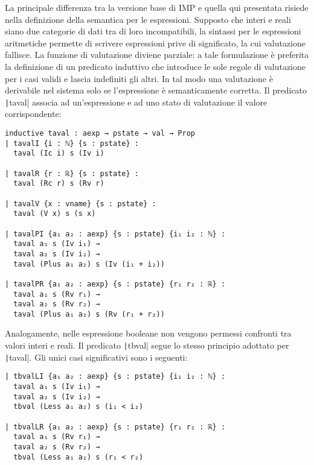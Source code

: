 La principale differenza tra la versione base di IMP e quella qui presentata risiede nella definizione della semantica per le espressioni.
Supposto che interi e reali siano due categorie di dati tra di loro incompatibili, la sintassi per le espressioni aritmetiche permette di scrivere espressioni prive di significato, la cui valutazione fallisce. La funzione di valutazione diviene parziale: a tale formulazione è preferita la definizione di un predicato induttivo che introduce le sole regole di valutazione per i casi validi e lascia indefiniti gli altri. In tal modo una valutazione è derivabile nel sistema solo se l'espressione è semanticamente corretta. Il predicato \texttt|taval| associa ad un'espressione e ad uno stato di valutazione il valore corrispondente:
\begin{verbatim}
inductive taval : aexp → pstate → val → Prop
| tavalI {i : ℕ} {s : pstate} : 
  taval (Ic i) s (Iv i)

| tavalR {r : ℝ} {s : pstate} : 
  taval (Rc r) s (Rv r)

| tavalV {x : vname} {s : pstate} :
  taval (V x) s (s x)

| tavalPI {a₁ a₂ : aexp} {s : pstate} {i₁ i₂ : ℕ} :
  taval a₁ s (Iv i₁) →
  taval a₂ s (Iv i₂) →
  taval (Plus a₁ a₂) s (Iv (i₁ + i₂))

| tavalPR {a₁ a₂ : aexp} {s : pstate} {r₁ r₂ : ℝ} :
  taval a₁ s (Rv r₁) →
  taval a₂ s (Rv r₂) →
  taval (Plus a₁ a₂) s (Rv (r₁ + r₂))
\end{verbatim}
Analogamente, nelle espressione booleane non vengono permessi confronti tra valori interi e reali. Il predicato \texttt|tbval| segue lo stesso principio adottato per \texttt|taval|. Gli unici casi significativi sono i seguenti:
\begin{verbatim}
| tbvalLI {a₁ a₂ : aexp} {s : pstate} {i₁ i₂ : ℕ} :
  taval a₁ s (Iv i₁) →
  taval a₂ s (Iv i₂) →
  tbval (Less a₁ a₂) s (i₁ < i₂)

| tbvalLR {a₁ a₂ : aexp} {s : pstate} {r₁ r₂ : ℝ} :
  taval a₁ s (Rv r₁) →
  taval a₂ s (Rv r₂) →
  tbval (Less a₁ a₂) s (r₁ < r₂)
\end{verbatim}

